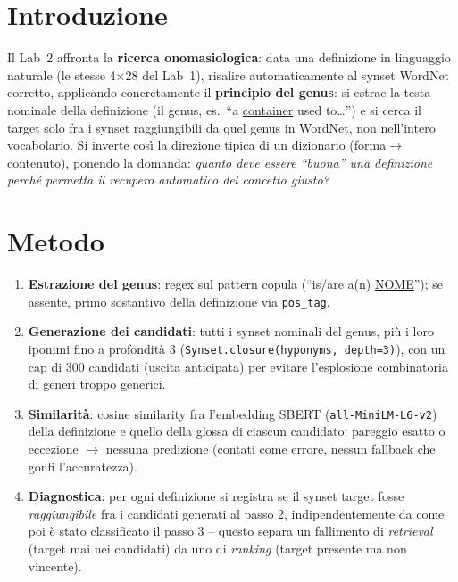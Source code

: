 \documentclass[12pt,a4paper]{article}
\begin{document}
\section{Introduzione}

Il Lab~2 affronta la \textbf{ricerca onomasiologica}: data una definizione in linguaggio naturale (le stesse 4$\times$28 del Lab~1), risalire automaticamente al synset WordNet corretto, applicando concretamente il \textbf{principio del genus}: si estrae la testa nominale della definizione (il genus, es.\ ``a \underline{container} used to\ldots'') e si cerca il target solo fra i synset raggiungibili da quel genus in WordNet, non nell'intero vocabolario. Si inverte cos\`i la direzione tipica di un dizionario (forma$\to$contenuto), ponendo la domanda: \emph{quanto deve essere ``buona'' una definizione perch\'e permetta il recupero automatico del concetto giusto?}

\section{Metodo}

\begin{enumerate}[noitemsep]
  \item \textbf{Estrazione del genus}: regex sul pattern copula (``is/are a(n) \underline{NOME}''); se assente, primo sostantivo della definizione via \texttt{pos\_tag}.
  \item \textbf{Generazione dei candidati}: tutti i synset nominali del genus, pi\`u i loro iponimi fino a profondit\`a 3 (\texttt{Synset.closure(hyponyms, depth=3)}), con un cap di 300 candidati (uscita anticipata) per evitare l'esplosione combinatoria di generi troppo generici.
  \item \textbf{Similarit\`a}: cosine similarity fra l'embedding SBERT (\texttt{all-MiniLM-L6-v2}) della definizione e quello della glossa di ciascun candidato; pareggio esatto o eccezione $\to$ nessuna predizione (contati come errore, nessun fallback che gonfi l'accuratezza).
  \item \textbf{Diagnostica}: per ogni definizione si registra se il synset target fosse \emph{raggiungibile} fra i candidati generati al passo 2, indipendentemente da come poi \`e stato classificato il passo 3 -- questo separa un fallimento di \emph{retrieval} (target mai nei candidati) da uno di \emph{ranking} (target presente ma non vincente).
\end{enumerate}
\end{document}
